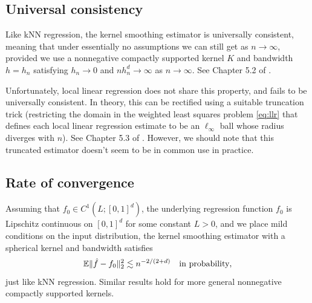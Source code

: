 \documentclass{article}
\begin{document}
\subsection{Universal consistency}

Like kNN regression, the kernel smoothing estimator is universally consistent,
meaning that under essentially no assumptions we can still get
 as $n \to \infty$, provided we use a
nonnegative compactly supported kernel $K$ and bandwidth $h=h_n$ satisfying 
$h_n \to 0$ and $nh_n^d \to \infty$ as $n \to \infty$. See Chapter 5.2 of
\citet{gyorfi2002distribution}. 

Unfortunately, local linear regression does not share this property, and fails
to be universally consistent. In theory, this can be rectified using a suitable
truncation trick (restricting the domain in the weighted least squares problem
\eqref{eq:llr} that defines each local linear regression estimate to be an
$\ell_\infty$ ball whose radius diverges with $n$). See Chapter 5.3 of 
\citet{gyorfi2002distribution}. However, we should note that this truncated
estimator doesn't seem to be in common use in practice.  

\subsection{Rate of convergence}

Assuming that $f_0 \in C^1(L; [0,1]^d)$, the underlying regression function
$f_0$ is Lipschitz continuous on $[0,1]^d$ for some constant $L>0$, and we place
mild conditions on the input distribution, the kernel smoothing estimator with a  
spherical kernel and bandwidth  satisfies    
\begin{equation}
\label{eq:kernel_rate}
\mathbb{E}\|\hat{f} - f_0\|_2^2 \lesssim n^{-2/(2+d)} \quad \text{in probability},
\end{equation}
just like kNN regression. Similar results hold for more general nonnegative
compactly supported kernels.
\end{document}
